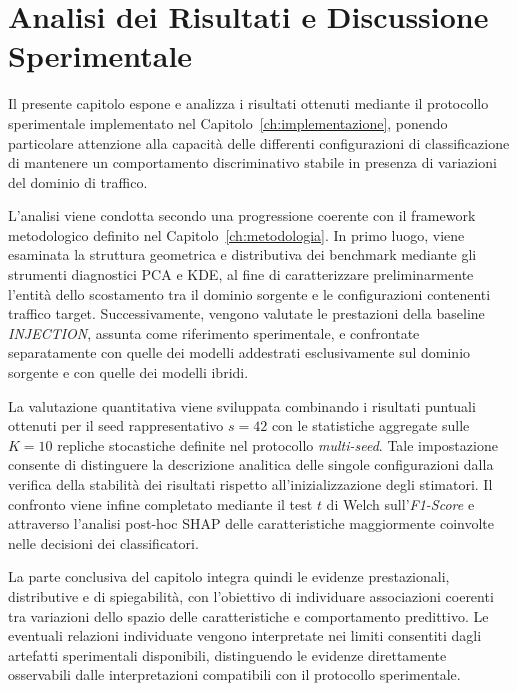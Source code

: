 \chapter{Analisi dei Risultati e Discussione Sperimentale}
\label{ch:risultati}

Il presente capitolo espone e analizza i risultati ottenuti mediante il protocollo sperimentale implementato nel Capitolo~\ref{ch:implementazione}, ponendo particolare attenzione alla capacità delle differenti configurazioni di classificazione di mantenere un comportamento discriminativo stabile in presenza di variazioni del dominio di traffico.

L'analisi viene condotta secondo una progressione coerente con il framework metodologico definito nel Capitolo~\ref{ch:metodologia}. 
In primo luogo, viene esaminata la struttura geometrica e distributiva dei benchmark mediante gli strumenti diagnostici PCA e KDE, al fine di caratterizzare preliminarmente l'entità dello scostamento tra il dominio sorgente e le configurazioni contenenti traffico target. 
Successivamente, vengono valutate le prestazioni della baseline \textit{INJECTION}, assunta come riferimento sperimentale, e confrontate separatamente con quelle dei modelli addestrati esclusivamente sul dominio sorgente e con quelle dei modelli ibridi.

La valutazione quantitativa viene sviluppata combinando i risultati puntuali ottenuti per il seed rappresentativo $s=42$ con le statistiche aggregate sulle $K=10$ repliche stocastiche definite nel protocollo \textit{multi-seed}. 
Tale impostazione consente di distinguere la descrizione analitica delle singole configurazioni dalla verifica della stabilità dei risultati rispetto all'inizializzazione degli stimatori. 
Il confronto viene infine completato mediante il test $t$ di Welch sull'\textit{F1-Score} e attraverso l'analisi post-hoc SHAP delle caratteristiche maggiormente coinvolte nelle decisioni dei classificatori.

La parte conclusiva del capitolo integra quindi le evidenze prestazionali, distributive e di spiegabilità, con l'obiettivo di individuare associazioni coerenti tra variazioni dello spazio delle caratteristiche e comportamento predittivo. 
Le eventuali relazioni individuate vengono interpretate nei limiti consentiti dagli artefatti sperimentali disponibili, distinguendo le evidenze direttamente osservabili dalle interpretazioni compatibili con il protocollo sperimentale.


